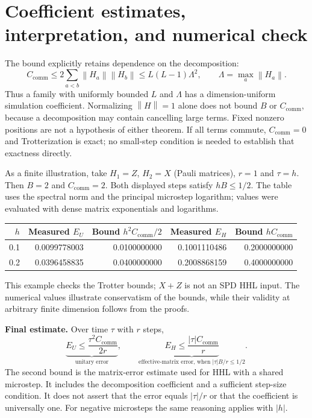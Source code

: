 \documentclass[11pt,a4paper]{article}
\newcommand{\norm}[1]{\left\lVert #1\right\rVert}
\newcommand{\CC}{C_{\mathrm{comm}}}
\begin{document}
\section{Coefficient estimates, interpretation, and numerical check}
The bound explicitly retains dependence on the decomposition:
\begin{equation}
 \CC\leq2\sum_{a<b}\norm{H_a}\norm{H_b}
 \leq L(L-1)\Lambda^2,\qquad \Lambda=\max_a\norm{H_a}.
\end{equation}
Thus a family with uniformly bounded $L$ and $\Lambda$ has a dimension-uniform simulation coefficient. Normalizing $\norm H=1$ alone does not bound $B$ or $\CC$, because a decomposition may contain cancelling large terms. Fixed nonzero positions are not a hypothesis of either theorem. If all terms commute, $\CC=0$ and Trotterization is exact; no small-step condition is needed to establish that exactness directly.

As a finite illustration, take $H_1=Z$, $H_2=X$ (Pauli matrices), $r=1$ and $\tau=h$. Then $B=2$ and $\CC=2$. Both displayed steps satisfy $hB\leq1/2$. The table uses the spectral norm and the principal microstep logarithm; values were evaluated with dense matrix exponentials and logarithms.
\begin{center}
\small
\begin{tabular}{rrrrr}
\toprule
$h$ & Measured $E_U$ & Bound $h^2\CC/2$ & Measured $E_H$ & Bound $h\CC$\\
\midrule
0.1 & 0.0099778003 & 0.0100000000 & 0.1001110486 & 0.2000000000\\
0.2 & 0.0396458835 & 0.0400000000 & 0.2008868159 & 0.4000000000\\
\bottomrule
\end{tabular}
\end{center}
This example checks the Trotter bounds; $X+Z$ is not an SPD HHL input. The numerical values illustrate conservatism of the bounds, while their validity at arbitrary finite dimension follows from the proofs.

\textbf{Final estimate.} Over time $\tau$ with $r$ steps,
\begin{equation}
 \underbrace{E_U\leq\frac{\tau^2\CC}{2r}}_{\text{unitary error}},
 \qquad
 \underbrace{E_H\leq\frac{|\tau|\CC}{r}}_{\text{effective-matrix error, when }|\tau|B/r\leq1/2}.
\end{equation}
The second bound is the matrix-error estimate used for HHL with a shared microstep. It includes the decomposition coefficient and a sufficient step-size condition. It does not assert that the error equals $|\tau|/r$ or that the coefficient is universally one. For negative microsteps the same reasoning applies with $|h|$.
\end{document}
